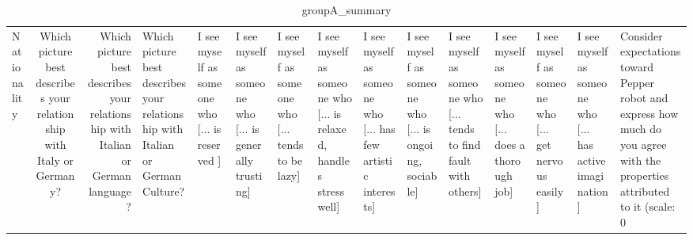 \begin{table}
\caption{groupA_summary}
\label{tab:groupA_summary}
\begin{tabular}{lcr}
\toprule
Nationality & Which picture best describes your relationship with Italy or Germany? & Which picture best describes your relationship with Italian or German language? & Which picture best describes your relationship with Italian or German Culture? & I see myself as someone who  [... is reserved ] & I see myself as someone who  [... is generally trusting] & I see myself as someone who  [... tends to be lazy] & I see myself as someone who  [... is relaxed, handles stress well] & I see myself as someone who  [... has few artistic interests] & I see myself as someone who  [... is ongoing, sociable] & I see myself as someone who  [... tends to find fault with others] & I see myself as someone who  [... does a thorough job] & I see myself as someone who  [... get nervous easily] & I see myself as someone who  [... has active imagination] & Consider expectations toward Pepper robot and express how much do you agree with the properties attributed to it (scale: 0%
\end{tabular}
\end{table}
